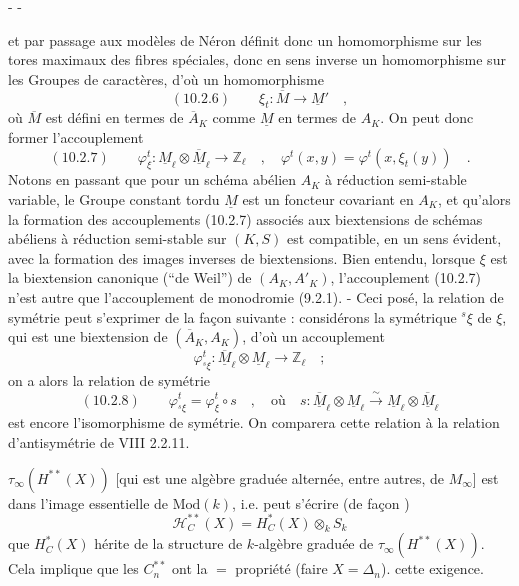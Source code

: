 \begin{center}-  -\end{center}
et par passage aux modèles de Néron définit donc un homomorphisme sur les tores maximaux des fibres spéciales, donc en sens inverse un homomorphisme sur les Groupes de caractères, d'où un homomorphisme
\[
(10.2.6)\qquad \xi_t:\overline M\longrightarrow\underline M'\quad,
\]
où $\overline M$ est défini en termes de $\overline A_K$ comme $\underline M$ en termes de $A_K$. On peut donc former l'accouplement
\[
(10.2.7)\qquad \varphi_\xi^t:\underline M_\ell\otimes\overline{\underline M}_\ell\longrightarrow\mathbb Z_\ell\quad,\quad
\varphi^t(x,y)=\varphi^t(x,\xi_t(y))\quad.
\]
Notons en passant que pour un schéma abélien $A_K$ à réduction semi-stable variable, le Groupe constant tordu $\underline M$ est un foncteur covariant en $A_K$, et qu'alors la formation des accouplements (10.2.7) associés aux biextensions de schémas abéliens à réduction semi-stable sur $(K,S)$ est compatible, en un sens évident, avec la formation des images inverses de biextensions. Bien entendu, lorsque $\xi$ est la biextension canonique (``de Weil'') de $(A_K,A'_K)$, l'accouplement (10.2.7) n'est autre que l'accouplement de monodromie (9.2.1). - Ceci posé, la relation de symétrie peut s'exprimer de la façon suivante : considérons la symétrique ${}^s\xi$ de $\xi$, qui est une biextension de $(\overline A_K,A_K)$, d'où un accouplement
\[
\varphi_{{}^s\xi}^t:\overline{\underline M}_\ell\otimes\underline M_\ell\longrightarrow\mathbb Z_\ell\quad;
\]
on a alors la relation de symétrie
\[
(10.2.8)\qquad\varphi_{{}^s\xi}^t=\varphi_\xi^t\circ s\quad,\quad
\text{où}\quad s:\overline{\underline M}_\ell\otimes\underline M_\ell\xrightarrow{\sim}\underline M_\ell\otimes\overline{\underline M}_\ell
\]
est encore l'isomorphisme de symétrie. On comparera cette relation à la relation d'antisymétrie de VIII 2.2.11.

$\tau_\infty(H^{**}(X))$ [qui est une algèbre graduée  alternée, entre autres, de $M_\infty$] est  dans l'image essentielle de $\mathrm{Mod}(k)$, i.e. peut s'écrire (de façon  )
\[
\mathcal H_C^{**}(X)=H_C^*(X)\otimes_k S_k
\]
 que $H_C^*(X)$ hérite de la structure de $k$-algèbre graduée de $\tau_\infty(H^{**}(X))$. Cela implique que  les $C_n^{**}$ ont la $=$ propriété (faire $X=\Delta_n$).
 cette exigence.

